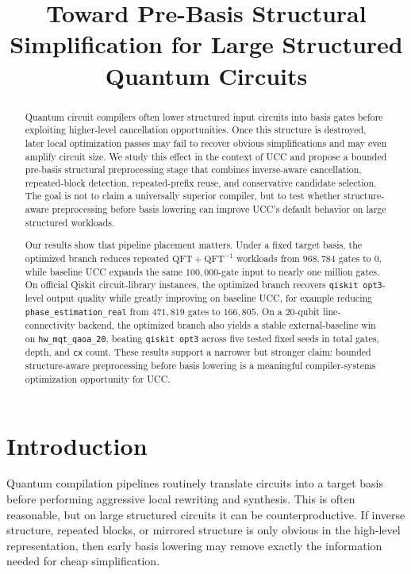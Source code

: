 \documentclass[11pt]{article}
\title{Toward Pre-Basis Structural Simplification for Large Structured Quantum Circuits}
\author{}
\date{}
\begin{document}
\maketitle

\begin{abstract}
Quantum circuit compilers often lower structured input circuits into basis gates before exploiting higher-level cancellation opportunities. Once this structure is destroyed, later local optimization passes may fail to recover obvious simplifications and may even amplify circuit size. We study this effect in the context of UCC and propose a bounded pre-basis structural preprocessing stage that combines inverse-aware cancellation, repeated-block detection, repeated-prefix reuse, and conservative candidate selection. The goal is not to claim a universally superior compiler, but to test whether structure-aware preprocessing before basis lowering can improve UCC's default behavior on large structured workloads.

Our results show that pipeline placement matters. Under a fixed target basis, the optimized branch reduces repeated $\mathrm{QFT}+\mathrm{QFT}^{-1}$ workloads from $968{,}784$ gates to $0$, while baseline UCC expands the same $100{,}000$-gate input to nearly one million gates. On official Qiskit circuit-library instances, the optimized branch recovers \texttt{qiskit opt3}-level output quality while greatly improving on baseline UCC, for example reducing \texttt{phase\_estimation\_real} from $471{,}819$ gates to $166{,}805$. On a $20$-qubit line-connectivity backend, the optimized branch also yields a stable external-baseline win on \texttt{hw\_mqt\_qaoa\_20}, beating \texttt{qiskit opt3} across five tested fixed seeds in total gates, depth, and \texttt{cx} count. These results support a narrower but stronger claim: bounded structure-aware preprocessing before basis lowering is a meaningful compiler-systems optimization opportunity for UCC.
\end{abstract}

\section{Introduction}

Quantum compilation pipelines routinely translate circuits into a target basis before performing aggressive local rewriting and synthesis. This is often reasonable, but on large structured circuits it can be counterproductive. If inverse structure, repeated blocks, or mirrored structure is only obvious in the high-level representation, then early basis lowering may remove exactly the information needed for cheap simplification.
\end{document}
